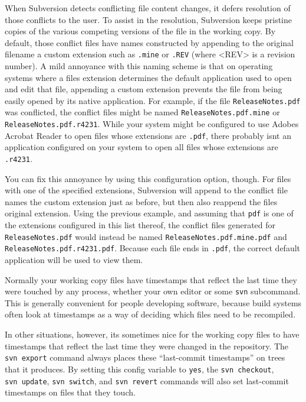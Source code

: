 \begin{description}
When Subversion detects conflicting file content changes, it defers
resolution of those conflicts to the user. To assist in the resolution,
Subversion keeps pristine copies of the various competing versions of
the file in the working copy. By default, those conflict files have
names constructed by appending to the original filename a custom
extension such as \texttt{.mine} or \texttt{.REV} (where
\textless REV\textgreater{} is a revision number). A mild annoyance with
this naming scheme is that on operating systems where a
file\textquotesingle s extension determines the default application used
to open and edit that file, appending a custom extension prevents the
file from being easily opened by its native application. For example, if
the file \texttt{ReleaseNotes.pdf} was conflicted, the conflict files
might be named \texttt{ReleaseNotes.pdf.mine} or
\texttt{ReleaseNotes.pdf.r4231}. While your system might be configured
to use Adobe\textquotesingle s Acrobat Reader to open files whose
extensions are \texttt{.pdf}, there probably isn\textquotesingle t an
application configured on your system to open all files whose extensions
are \texttt{.r4231}.

You can fix this annoyance by using this configuration option, though.
For files with one of the specified extensions, Subversion will append
to the conflict file names the custom extension just as before, but then
also reappend the file\textquotesingle s original extension. Using the
previous example, and assuming that \texttt{pdf} is one of the
extensions configured in this list thereof, the conflict files generated
for \texttt{ReleaseNotes.pdf} would instead be named
\texttt{ReleaseNotes.pdf.mine.pdf} and
\texttt{ReleaseNotes.pdf.r4231.pdf}. Because each file ends in
\texttt{.pdf}, the correct default application will be used to view
them.
\item[\texttt{use-commit-times}]
Normally your working copy files have timestamps that reflect the last
time they were touched by any process, whether your own editor or some
\texttt{svn} subcommand. This is generally convenient for people
developing software, because build systems often look at timestamps as a
way of deciding which files need to be recompiled.

In other situations, however, it\textquotesingle s sometimes nice for
the working copy files to have timestamps that reflect the last time
they were changed in the repository. The \texttt{svn\ export} command
always places these ``last-commit timestamps'' on trees that it
produces. By setting this config variable to \texttt{yes}, the
\texttt{svn\ checkout}, \texttt{svn\ update}, \texttt{svn\ switch}, and
\texttt{svn\ revert} commands will also set last-commit timestamps on
files that they touch.
\end{description}

